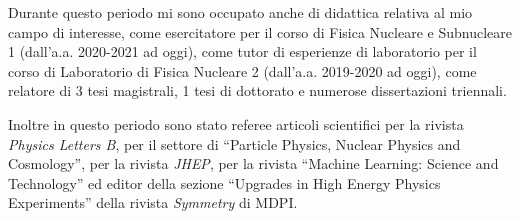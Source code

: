 \documentclass[a4paper,12pt,twoside]{article}
\begin{document}
{  Durante questo periodo mi sono occupato anche di didattica relativa
  al mio campo di interesse, come esercitatore per il corso di Fisica
  Nucleare e Subnucleare 1 (dall'a.a. 2020-2021 ad oggi), come tutor
  di esperienze di laboratorio per il corso di Laboratorio di Fisica
  Nucleare 2 (dall'a.a. 2019-2020 ad oggi), come relatore di 3 tesi
  magistrali, 1 tesi di dottorato e numerose dissertazioni triennali.

  Inoltre in questo periodo sono stato referee articoli scientifici
  per la rivista \textit{Physics Letters B}, per il settore di
  ``Particle Physics, Nuclear Physics and Cosmology'', per la rivista
  \textit{JHEP}, per la rivista ``Machine Learning: Science and
  Technology'' ed editor della sezione ``Upgrades in High Energy
  Physics Experiments'' della rivista \textit{Symmetry} di MDPI.
  
}


\citeall{*}
\end{document}
